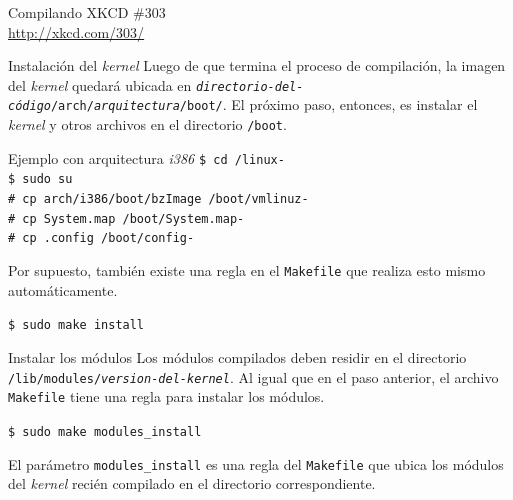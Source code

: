 \begin{frame}{Compilando}
  \large XKCD \#303 \\ \url{http://xkcd.com/303/}
  \begin{center}
   \end{center}
\end{frame}

\begin{frame}{Instalación del \textit{kernel}}
  Luego de que termina el proceso de compilación, la imagen del
  \textit{kernel} quedará ubicada en
  \texttt{\textit{directorio-del-código}/arch/\textit{arquitectura}/boot/}. El
  próximo paso, entonces, es instalar el \textit{kernel} y otros archivos
  en el directorio \texttt{/boot}.

  \begin{block}{Ejemplo con arquitectura \textit{i386}}
    \texttt{\$ cd \KERNELSOURCEPATH/linux-\KERNELBASEVERSION \\
\$ sudo su \\
\# cp arch/i386/boot/bzImage /boot/vmlinuz-\KERNELBASEVERSION \\
\# cp System.map /boot/System.map-\KERNELBASEVERSION \\
\# cp .config /boot/config-\KERNELBASEVERSION}
  \end{block}
  \vfill \pause

  Por supuesto, también existe una regla en el \texttt{Makefile} que
  realiza esto mismo automáticamente.
  \begin{block}{}
    \texttt{\$ sudo make install}
  \end{block}  
\end{frame}

\begin{frame}{Instalar los módulos}
  Los módulos compilados deben residir en el directorio
  \texttt{/lib/modules/\textit{version-del-kernel}}. Al igual que en el
  paso anterior, el archivo \texttt{Makefile} tiene una regla para instalar
  los módulos.
  \begin{block}{}
    \texttt{\$ sudo make modules\_install}
  \end{block}
  El parámetro \texttt{modules\_install} es una regla del \texttt{Makefile}
  que ubica los módulos del \textit{kernel} recién compilado en el
  directorio correspondiente.
\end{frame}

